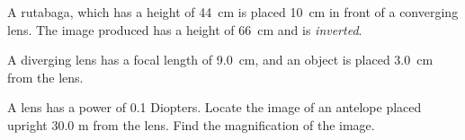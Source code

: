 \documentclass[10pt]{exam}
\begin{document}
\begin{questions}
  \question
    A rutabaga, which has a height of 44~cm is placed 10~cm in front of a converging lens.  The image produced has a height of 66~cm and is \emph{inverted}.  

    \vs[2]


    
\pagebreak

  \question
    A diverging lens has a focal length of 9.0~cm, and an object is placed 3.0~cm from the lens.

    \vs


  \question
    A lens has a power of 0.1 Diopters.  Locate the image of an antelope placed upright 30.0 m from the lens.  Find the magnification of the image.  
    \vs

\end{questions}
\end{document}
